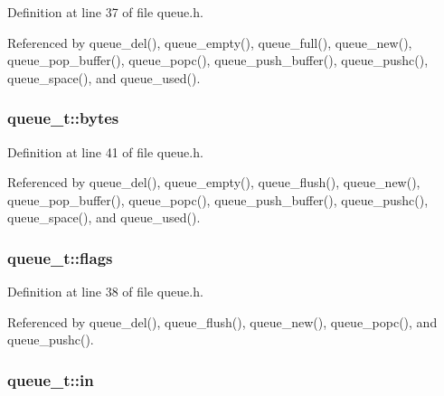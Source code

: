 Definition at line 37 of file queue.\+h.



Referenced by queue\+\_\+del(), queue\+\_\+empty(), queue\+\_\+full(), queue\+\_\+new(), queue\+\_\+pop\+\_\+buffer(), queue\+\_\+popc(), queue\+\_\+push\+\_\+buffer(), queue\+\_\+pushc(), queue\+\_\+space(), and queue\+\_\+used().

\subsubsection[{\texorpdfstring{bytes}{bytes}}]{ queue\+\_\+t\+::bytes}\hypertarget{structqueue__t_a58398d4ee60bc90ffba2bc3488fe185b}{}\label{structqueue__t_a58398d4ee60bc90ffba2bc3488fe185b}


Definition at line 41 of file queue.\+h.



Referenced by queue\+\_\+del(), queue\+\_\+empty(), queue\+\_\+flush(), queue\+\_\+new(), queue\+\_\+pop\+\_\+buffer(), queue\+\_\+popc(), queue\+\_\+push\+\_\+buffer(), queue\+\_\+pushc(), queue\+\_\+space(), and queue\+\_\+used().

\subsubsection[{\texorpdfstring{flags}{flags}}]{ queue\+\_\+t\+::flags}\hypertarget{structqueue__t_a2a516773a572c746d461c9df3cb30387}{}\label{structqueue__t_a2a516773a572c746d461c9df3cb30387}


Definition at line 38 of file queue.\+h.



Referenced by queue\+\_\+del(), queue\+\_\+flush(), queue\+\_\+new(), queue\+\_\+popc(), and queue\+\_\+pushc().

\subsubsection[{\texorpdfstring{in}{in}}]{ queue\+\_\+t\+::in}\hypertarget{structqueue__t_a7a6832e36c70a1db7fddc93fb6be9d63}{}\label{structqueue__t_a7a6832e36c70a1db7fddc93fb6be9d63}



